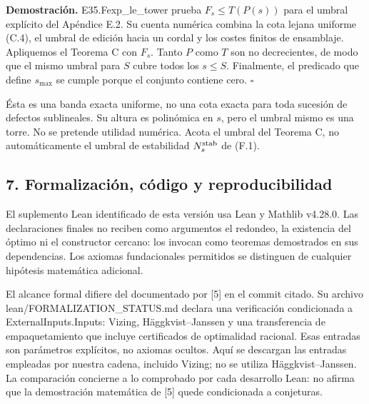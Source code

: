 \documentclass[spanish,11pt,a4paper]{article}
\begin{document}
\textbf{Demostración.} {\ttfamily\small E35.\discretionary{\hbox{\ensuremath{\hookrightarrow}}}{}{}Fexp\_\discretionary{\hbox{\ensuremath{\hookrightarrow}}}{}{}le\_\discretionary{\hbox{\ensuremath{\hookrightarrow}}}{}{}tower} prueba \(F_s\le T(P(s))\) para el umbral explícito del Apéndice E.2. Su cuenta numérica combina la cota lejana uniforme (C.4), el umbral de edición hacia un cordal y los costes finitos de ensamblaje. Apliquemos el Teorema C con \(F_s\). Tanto \(P\) como \(T\) son no decrecientes, de modo que el mismo umbral para \(S\) cubre todos los \(s\le S\). Finalmente, el predicado que define \(s_{\max}\) se cumple porque el conjunto contiene cero. \(\square\)

Ésta es una banda exacta uniforme, no una cota exacta para toda sucesión de defectos sublineales. Su altura es polinómica en \(s\), pero el umbral mismo es una torre. No se pretende utilidad numérica. Acota el umbral del Teorema C, no automáticamente el umbral de estabilidad \(N_s^{\rm stab}\) de (F.1).

\subsection{7. Formalización, código y reproducibilidad}\label{formalizacion-codigo-y-reproducibilidad}

El suplemento Lean identificado de esta versión usa Lean y Mathlib v4.28.0. Las declaraciones finales no reciben como argumentos el redondeo, la existencia del óptimo ni el constructor cercano: los invocan como teoremas demostrados en sus dependencias. Los axiomas fundacionales permitidos se distinguen de cualquier hipótesis matemática adicional.

El alcance formal difiere del documentado por {[}5{]} en el commit citado. Su archivo {\ttfamily\small lean/\discretionary{\hbox{\ensuremath{\hookrightarrow}}}{}{}FORMALIZATIO\discretionary{\hbox{\ensuremath{\hookrightarrow}}}{}{}N\_\discretionary{\hbox{\ensuremath{\hookrightarrow}}}{}{}STATUS.\discretionary{\hbox{\ensuremath{\hookrightarrow}}}{}{}md} declara una verificación condicionada a {\ttfamily\small ExternalInpu\discretionary{\hbox{\ensuremath{\hookrightarrow}}}{}{}ts.\discretionary{\hbox{\ensuremath{\hookrightarrow}}}{}{}Inputs}: Vizing, Häggkvist--Janssen y una transferencia de empaquetamiento que incluye certificados de optimalidad racional. Esas entradas son parámetros explícitos, no axiomas ocultos. Aquí se descargan las entradas empleadas por nuestra cadena, incluido Vizing; no se utiliza Häggkvist--Janssen. La comparación concierne a lo comprobado por cada desarrollo Lean: no afirma que la demostración matemática de {[}5{]} quede condicionada a conjeturas.
\end{document}

